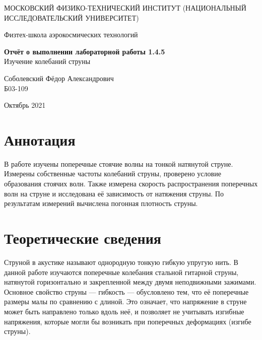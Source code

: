 \documentclass[a4paper,12pt]{article} %
\date{\today}
\begin{document}
\begin{titlepage}
	\begin{center}
		{\large МОСКОВСКИЙ ФИЗИКО-ТЕХНИЧЕСКИЙ ИНСТИТУТ (НАЦИОНАЛЬНЫЙ ИССЛЕДОВАТЕЛЬСКИЙ УНИВЕРСИТЕТ)}
	\end{center}
	\begin{center}
		{\large Физтех-школа аэрокосмических технологий}
	\end{center}
	
	
	\vspace{4.5cm}
	{\huge
		\begin{center}
			{\bf Отчёт о выполнении лабораторной работы 1.4.5}\\
			Изучение колебаний струны
		\end{center}
	}
	\vspace{1cm}
	\begin{center}
		{\large Соболевский Фёдор Александрович \\
			\vspace{0.2cm}
			Б03-109}
	\end{center}
	\vspace{8cm}
	\begin{center}
		Октябрь 2021
	\end{center}
\end{titlepage}

\section{Аннотация}

В работе изучены поперечные стоячие волны на тонкой натянутой струне.
Измерены собственные частоты колебаний струны, проверено условие образования
стоячих волн. Также измерена скорость распространения поперечных волн на струне и исследована её зависимость от натяжения струны. По результатам измерений вычислена погонная плотность струны. 

\section{Теоретические сведения}

Струной в акустике называют однородную тонкую гибкую упругую
нить. В данной работе
изучаются поперечные колебания стальной гитарной струны, натянутой горизонтально и закрепленной между двумя неподвижными зажимами.
Основное свойство струны — гибкость — обусловлено тем, что её поперечные размеры малы по сравнению с длиной. Это означает, что напряжение в струне может быть направлено только вдоль неё, и позволяет не
учитывать изгибные напряжения, которые могли бы возникать при поперечных деформациях (изгибе струны).
\end{document}
